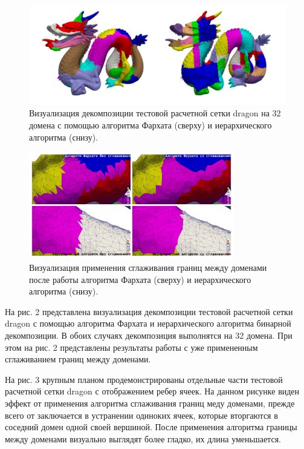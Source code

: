 \begin{figure}[ht]
	\centering
		\includegraphics[width=1.0\textwidth]{./pics/text_2_smooth/decomp.pdf}
	\caption{Визуализация декомпозиции тестовой расчетной сетки dragon на 32 домена с помощью алгоритма Фархата (сверху) и иерархического алгоритма (снизу).}
	\label{fig:text_2_smooth_decomp}
\end{figure}

\begin{figure}[ht]
	\centering
		\includegraphics[width=0.8\textwidth]{./pics/text_2_smooth/decomp2.pdf}
	\caption{Визуализация применения сглаживания границ между доменами после работы алгоритма Фархата (сверху) и иерархического алгоритма (снизу).}
	\label{fig:text_2_smooth_decomp2}
\end{figure}

На рис. 2 представлена визуализация декомпозиции тестовой расчетной сетки dragon с помощью алгоритма Фархата и иерархического алгоритма бинарной декомпозиции.
В обоих случаях декомпозиция выполнятся на 32 домена.
При этом на рис. 2 представлены результаты работы с уже примененным сглаживанием границ между доменами.

На рис. 3 крупным планом продемонстрированы отдельные части тестовой расчетной сетки dragon с отображением ребер ячеек.
На данном рисунке виден эффект от применения алгоритма сглаживания границ меду доменами, прежде всего от заключается в устранении одиноких ячеек, которые вторгаются в соседний домен одной своей вершиной.
После применения алгоритма границы между доменами визуально выглядят более гладко, их длина уменьшается.

